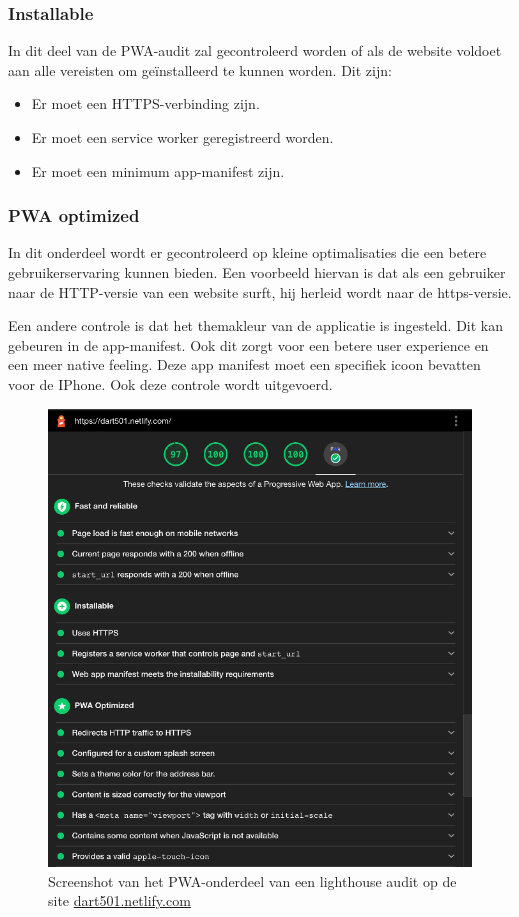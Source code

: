 	
	\subsubsection{Installable}
	
		In dit deel van de PWA-audit zal gecontroleerd worden of als de website voldoet aan alle vereisten om geïnstalleerd te kunnen worden. Dit zijn:
		\begin{itemize}
			\item	Er moet een HTTPS-verbinding zijn.
			\item	Er moet een service worker geregistreerd worden.
			\item	Er moet een minimum app-manifest zijn.
		\end{itemize}
	
		\autocite{web.dev2020a}
		
	
	\subsubsection{PWA optimized}
	
		In dit onderdeel wordt er gecontroleerd op kleine optimalisaties die een betere gebruikerservaring kunnen bieden. 
		Een voorbeeld hiervan is dat als een gebruiker naar de HTTP-versie van een website surft, hij herleid wordt naar de https-versie.
		
		Een andere controle is dat het themakleur van de applicatie is ingesteld. Dit kan gebeuren in de app-manifest. Ook dit zorgt voor een betere user experience en een meer native feeling. Deze app manifest moet een specifiek icoon bevatten voor de IPhone. Ook deze controle wordt uitgevoerd.
		
		
		\begin{figure}[H]
			\centering
			\includegraphics{./img/lighthouse.png}
			\caption{Screenshot van het PWA-onderdeel van een lighthouse audit op de site \href{ https://dart501.netlify.com}{dart501.netlify.com} }
		\end{figure}
		
